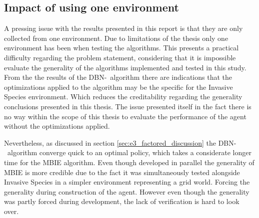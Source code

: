 \subsection{Impact of using one environment }
\label{sec:impact_of_one_env}
A pressing issue with the results presented in this report is that they are only collected from one environment. Due to limitations of the thesis only one environment has been when testing the algorithms. This presents a practical difficulty regarding the problem statement, considering that it is impossible evaluate the generality of the algorithms implemented and tested in this study. From the the results of the DBN-\etre\ algorithm there are indications that the optimizations applied to the algorithm may be the specific for the Invasive Species environment. Which reduces the creditability regarding the generality conclusions presented in this thesis. The issue presented itself in the fact there is no way within the scope of this thesis to evaluate the performance of the agent without the optimizations applied. 

Nevertheless, as discussed in section \ref{sec:e3_factored_discussion} the DBN-\etre\ algorithm converge quick to an optimal policy, which takes a considerate longer time for the MBIE algorithm. Even though developed in parallel the generality of MBIE is more credible due to the fact it was simultaneously tested alongside Invasive Species in a simpler environment representing a grid world. Forcing the generality during construction of the agent. However even though the generality was partly forced during development, the lack of verification is hard to look over. 